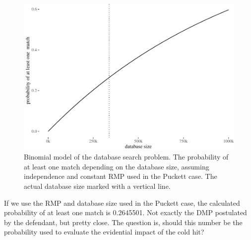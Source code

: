\documentclass[10pt,dvipsnames,enabledeprecatedfontcommands]{scrartcl}
\begin{document}
\begin{figure}

{\centering \includegraphics[width=0.8\linewidth]{lr-chapter_files/figure-latex/unnamed-chunk-4-1} 

}

\caption{Binomial model of the database search problem. The probability of at least one match depending on the database size, assuming independence and constant RMP used in  the Puckett case. The actual database size marked with a vertical line.}\label{fig:unnamed-chunk-4}
\end{figure}

If we use the RMP and database size used in the Puckett case, the
calculated probability of at least one match is 0.2645501. Not exactly
the DMP postulated by the defendant, but pretty close. The question is,
should this number be the probability used to evaluate the evidential
impact of the cold hit?

\end{document}
